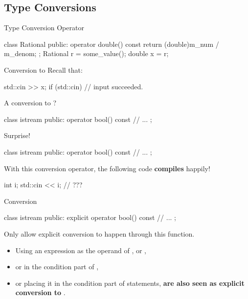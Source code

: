 \subsection{Type Conversions}

\begin{frame}[fragile]{Type Conversion Operator}
    \begin{cpp}
class Rational {
 public:
  operator double() const {
    return (double)m_num / m_denom;
  }
};
Rational r = some_value();
double x = r;
    \end{cpp}
\end{frame}

\begin{frame}[fragile]{Conversion to }
    Recall that:
    \begin{cpp}
std::cin >> x;
if (std::cin)
  // input succeeded.
    \end{cpp}
    A conversion to ?
    \begin{cpp}
class istream {
 public:
  operator bool() const {
    // ...
  }
};
    \end{cpp}
\end{frame}

\begin{frame}[fragile]{Surprise!}
    \begin{cpp}
class istream {
 public:
  operator bool() const {
    // ...
  }
};
    \end{cpp}
    With this conversion operator, the following code \textbf{compiles} happily!
    \begin{cpp}
int i;
std::cin << i; // ???
    \end{cpp}
\end{frame}

\begin{frame}[fragile]{ Conversion}
    \begin{cpp}
class istream {
 public:
  explicit operator bool() const {
    // ...
  }
};
    \end{cpp}
    Only allow explicit conversion to happen through this function.
    \begin{itemize}
        \item Using an expression as the operand of ,  or ,
        \item or in the condition part of ,
        \item or placing it in the condition part of  statements, \textbf{are also seen as explicit conversion to }.
    \end{itemize}
\end{frame}

